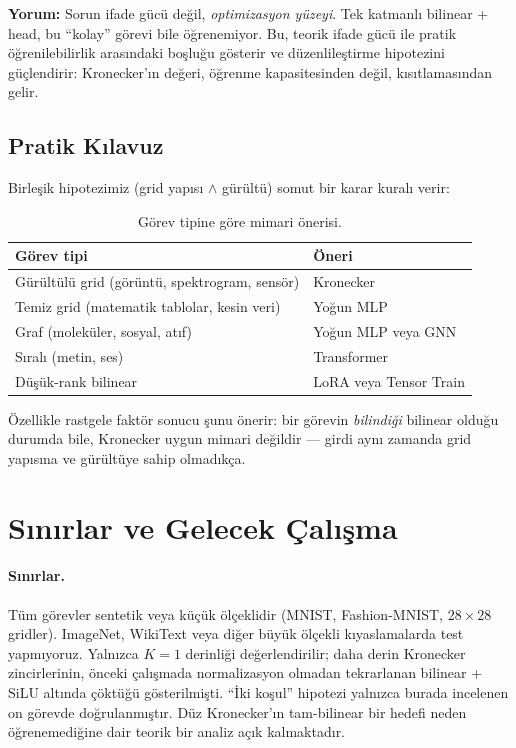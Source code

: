 \documentclass[11pt,a4paper]{article}
\begin{document}
\textbf{Yorum:} Sorun ifade gücü değil, \emph{optimizasyon
yüzeyi}. Tek katmanlı bilinear + head, bu ``kolay'' görevi bile
öğrenemiyor. Bu, teorik ifade gücü ile pratik öğrenilebilirlik
arasındaki boşluğu gösterir ve düzenlileştirme hipotezini
güçlendirir: Kronecker'ın değeri, öğrenme kapasitesinden değil,
kısıtlamasından gelir.

\subsection{Pratik Kılavuz}

Birleşik hipotezimiz (grid yapısı $\land$ gürültü) somut bir
karar kuralı verir:

\begin{table}[h]
\centering
\caption{Görev tipine göre mimari önerisi.}
\label{tab:guide}
\small
\begin{tabular}{ll}
\toprule
Görev tipi & Öneri \\
\midrule
Gürültülü grid (görüntü, spektrogram, sensör) & Kronecker \\
Temiz grid (matematik tablolar, kesin veri)   & Yoğun MLP \\
Graf (moleküler, sosyal, atıf)                & Yoğun MLP veya GNN \\
Sıralı (metin, ses)                           & Transformer \\
Düşük-rank bilinear                           & LoRA veya Tensor Train \\
\bottomrule
\end{tabular}
\end{table}

Özellikle rastgele faktör sonucu şunu önerir: bir görevin
\emph{bilindiği} bilinear olduğu durumda bile, Kronecker uygun
mimari değildir --- girdi aynı zamanda grid yapısına ve gürültüye
sahip olmadıkça.


\section{Sınırlar ve Gelecek Çalışma}
\label{sec:limitations}

\paragraph{Sınırlar.}
Tüm görevler sentetik veya küçük ölçeklidir (MNIST, Fashion-MNIST,
$28 \times 28$ gridler). ImageNet, WikiText veya diğer büyük
ölçekli kıyaslamalarda test yapmıyoruz. Yalnızca $K=1$ derinliği
değerlendirilir; daha derin Kronecker zincirlerinin, önceki
çalışmada normalizasyon olmadan tekrarlanan bilinear + SiLU
altında çöktüğü gösterilmişti. ``İki koşul'' hipotezi yalnızca
burada incelenen on görevde doğrulanmıştır. Düz Kronecker'ın
tam-bilinear bir hedefi neden öğrenemediğine dair teorik bir
analiz açık kalmaktadır.
\end{document}

